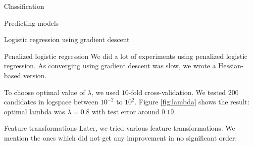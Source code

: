 \documentclass{article}
\begin{document}
\begin{section}{Classification}
\begin{subsection}{Predicting models}
\begin{subsubsection}{Logistic regression using gradient descent}
\end{subsubsection}
\begin{subsubsection}{Penalized logistic regression}
We did a lot of experiments using penalized logistic regression. As converging using gradient descent was slow, we wrote a Hessian-based version.

To choose optimal value of $\lambda$, we used $10$-fold cross-validation. We tested $200$ candidates in logspace between $10^{-2}$ to $10^2$. Figure \ref{fig:lambda} shows the result: optimal lambda was $\lambda = 0.8$ with test error around $0.19$.

\begin{figure}[!t]
\center

\hfill
{}
\caption{}
\end{figure}

\begin{subsubsection}{Feature transformations}
Later, we tried various feature transformations. We mention the ones which did not get any improvement in no significant order:
\begin{itemize}


\end{itemize}
\end{subsubsection}
\end{subsubsection}
\end{subsection}
\end{section}
\end{document}
